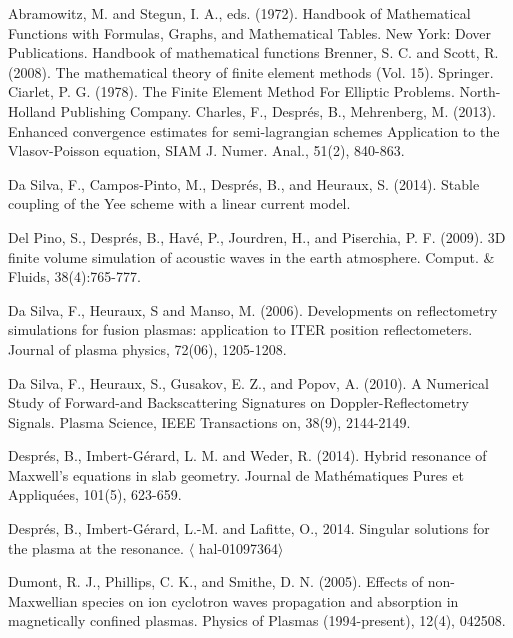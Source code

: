 \documentclass[proc]{edpsmath}
\begin{document}
\begin{thebibliography}{99}
	
	
 Abramowitz, M. and Stegun, I. A., eds. (1972). Handbook of Mathematical Functions with Formulas, Graphs, and Mathematical Tables. New York: Dover Publications.
	Handbook of mathematical functions
 Brenner, S. C. and Scott, R. (2008). The mathematical theory of finite element methods (Vol. 15). Springer.
Ciarlet, P. G. (1978).  The Finite Element Method For Elliptic Problems. North-Holland Publishing Company.
Charles, F., Despr\'es, B., Mehrenberg, M.  (2013).  
Enhanced convergence estimates for semi-lagrangian schemes Application to the Vlasov-Poisson equation, SIAM J. Numer. Anal., 51(2), 840-863.

 Da Silva, F., Campos-Pinto, M., Després, B., and Heuraux, S. (2014). Stable coupling of the Yee scheme with a linear current model.

Del Pino, S., Despr\'es, B., Hav\'e, P., Jourdren, H., and Piserchia, P. F. (2009). 3D finite
volume simulation of acoustic waves in the earth atmosphere.
Comput. \&
Fluids, 38(4):765-777.

 Da Silva, F., Heuraux, S and  Manso, M. (2006). Developments on reflectometry simulations for fusion plasmas: application to ITER position reflectometers. Journal of plasma physics, 72(06), 1205-1208.

Da Silva, F., Heuraux, S., Gusakov, E. Z., and Popov, A. (2010). A Numerical Study of Forward-and Backscattering Signatures on Doppler-Reflectometry Signals. Plasma Science, IEEE Transactions on, 38(9), 2144-2149.

 Després, B., Imbert-Gérard, L. M. and Weder, R. (2014). Hybrid resonance of Maxwell's equations in slab geometry. Journal de Mathématiques Pures et Appliquées, 101(5), 623-659.

Despr\'es, B., Imbert-G\'erard, L.-M. and Lafitte, O., 2014. Singular solutions for the plasma at the resonance. $\langle$ hal-01097364$\rangle$

 Dumont, R. J., Phillips, C. K., and Smithe, D. N. (2005). Effects of non-Maxwellian species on ion cyclotron waves propagation and absorption in magnetically confined plasmas. Physics of Plasmas (1994-present), 12(4), 042508.


\end{thebibliography}
\end{document}

